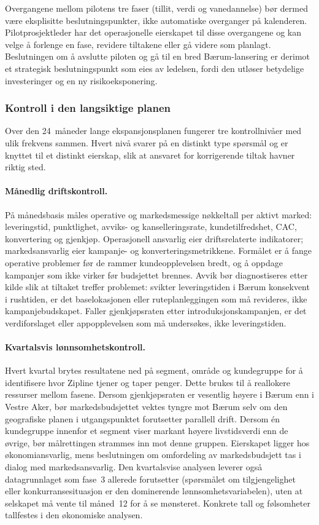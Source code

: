 Overgangene mellom pilotens tre faser (tillit, verdi og vanedannelse)
bør dermed være eksplisitte beslutningspunkter, ikke automatiske
overganger på kalenderen. Pilotprosjektleder har det operasjonelle
eierskapet til disse overgangene og kan velge å forlenge en fase,
revidere tiltakene eller gå videre som planlagt. Beslutningen om å
avslutte piloten og gå til en bred Bærum-lansering er derimot et
strategisk beslutningspunkt som eies av ledelsen, fordi den utløser
betydelige investeringer og en ny risikoeksponering.

\subsubsection{Kontroll i den langsiktige planen}

Over den 24~måneder lange ekspansjonsplanen fungerer tre kontrollnivåer
med ulik frekvens sammen. Hvert nivå svarer på en distinkt type spørsmål
og er knyttet til et distinkt eierskap, slik at ansvaret for
korrigerende tiltak havner riktig sted.

\paragraph{Månedlig driftskontroll.}
På månedsbasis måles operative og markedsmessige nøkkeltall per aktivt
marked: leveringstid, punktlighet, avviks- og kanselleringsrate,
kundetilfredshet, CAC, konvertering og gjenkjøp. Operasjonell ansvarlig
eier driftsrelaterte indikatorer; markedsansvarlig eier kampanje- og
konverteringsmetrikkene. Formålet er å fange operative problemer før de
rammer kundeopplevelsen bredt, og å oppdage kampanjer som ikke virker
før budsjettet brennes. Avvik bør diagnostiseres etter kilde slik at
tiltaket treffer problemet: svikter leveringstiden i Bærum konsekvent i
rushtiden, er det baselokasjonen eller ruteplanleggingen som må
revideres, ikke kampanjebudskapet. Faller gjenkjøpsraten etter
introduksjonskampanjen, er det verdiforslaget eller appopplevelsen som
må undersøkes, ikke leveringstiden.

\paragraph{Kvartalsvis lønnsomhetskontroll.}
Hvert kvartal brytes resultatene ned på segment, område og kundegruppe
for å identifisere hvor Zipline tjener og taper penger. Dette brukes til
å reallokere ressurser mellom fasene. Dersom gjenkjøpsraten er vesentlig
høyere i Bærum enn i Vestre Aker, bør markedsbudsjettet vektes tyngre
mot Bærum selv om den geografiske planen i utgangspunktet forutsetter
parallell drift. Dersom én kundegruppe innenfor et segment viser markant
høyere livstidsverdi enn de øvrige, bør målrettingen strammes inn mot
denne gruppen. Eierskapet ligger hos økonomiansvarlig, mens beslutningen
om omfordeling av markedsbudsjett tas i dialog med markedsansvarlig. Den
kvartalsvise analysen leverer også datagrunnlaget som fase~3 allerede
forutsetter (spørsmålet om tilgjengelighet eller konkurransesituasjon er
den dominerende lønnsomhetsvariabelen), uten at selskapet må vente til
måned~12 for å se mønsteret. Konkrete tall og følsomheter tallfestes
i den økonomiske analysen.

